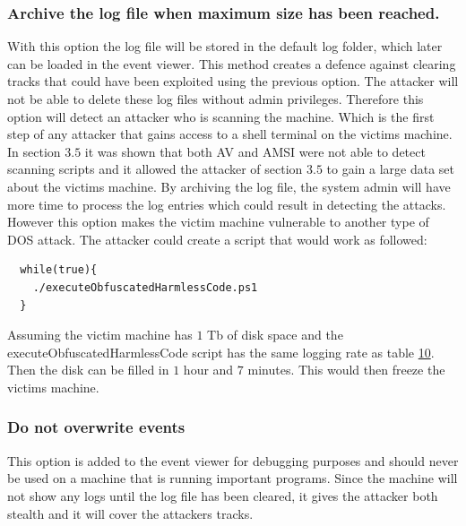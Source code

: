 \documentclass{article}%
\begin{document}
\subsubsection{Archive the log file when maximum size has been reached.}
With this option the log file will be stored in the default log folder, which later can be loaded in the event viewer. This method creates a defence against clearing tracks that could have been exploited using the previous option. The attacker will not be able to delete these log files without admin privileges. Therefore this option will detect an attacker who is scanning the machine. Which is the first step of any attacker that gains access to a shell terminal on the victims machine. In section $3.5$ it was shown that both AV and AMSI were not able to detect scanning scripts and it allowed the attacker of section $3.5$ to gain a large data set about the victims machine. By archiving the log file, the system admin will have more time to process the log entries which could result in detecting the attacks. However this option makes the victim machine vulnerable to another type of DOS attack. The attacker could create a script that would work as followed:
\begin{verbatim}
  while(true){
  	./executeObfuscatedHarmlessCode.ps1
  }
\end{verbatim}
Assuming the victim machine has $1$ Tb of disk space and the executeObfuscatedHarmlessCode script has the same logging rate as table \hyperlink{table10}{10}. Then the disk can be filled in $1$ hour and $7$ minutes. This would then freeze the victims machine.
\subsubsection{Do not overwrite events}
This option is added to the event viewer for debugging purposes and should never be used on a machine that is running important programs. Since the machine will not show any logs until the log file has been cleared, it gives the attacker both stealth and it will cover the attackers tracks. 
\end{document}
